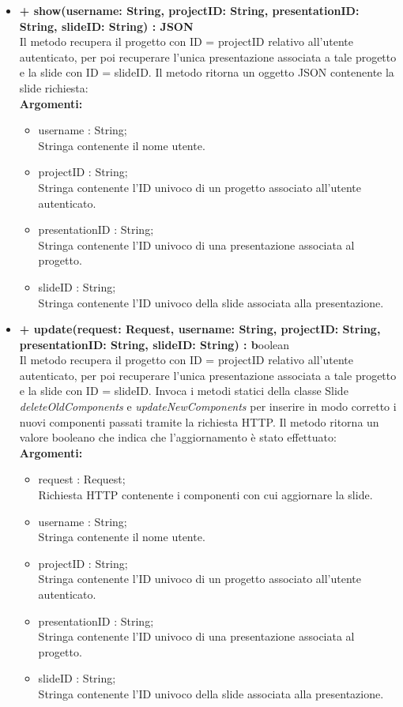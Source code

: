 \begin{itemize}
			\newpage
			\item \textbf{+ show(username: String, projectID: String, presentationID: String, slideID: String) : JSON}\\
				Il metodo recupera il progetto con ID = projectID relativo all'utente autenticato, per poi recuperare l'unica presentazione associata a tale progetto e la slide con ID = slideID. Il metodo ritorna un oggetto JSON contenente la slide richiesta:\\
				\textbf{Argomenti:}
					\begin{itemize}
						\item username : String; \\
						Stringa contenente il nome utente.
						\item projectID : String; \\
						Stringa contenente l'ID univoco di un progetto associato all'utente autenticato.
						\item presentationID : String; \\
						Stringa contenente l'ID univoco di una presentazione associata al progetto.
						\item slideID : String; \\
						Stringa contenente l'ID univoco della slide associata alla presentazione.
					\end{itemize}
					
			\item \textbf{+ update(request: Request, username: String, projectID: String, presentationID: String, slideID: String) : b}oolean\\
				Il metodo recupera il progetto con ID = projectID relativo all'utente autenticato, per poi recuperare l'unica presentazione associata a tale progetto e la slide con ID = slideID. Invoca i metodi statici della classe Slide \textit{deleteOldComponents} e \textit{updateNewComponents} per inserire in modo corretto i nuovi componenti passati tramite la richiesta HTTP. Il metodo ritorna un valore booleano che indica che l'aggiornamento è stato effettuato:\\
					\textbf{Argomenti:}
					\begin{itemize}
						\item request : Request;\\
						Richiesta HTTP contenente i componenti con cui aggiornare la slide.
						\item username : String; \\
						Stringa contenente il nome utente.
						\item projectID : String; \\
						Stringa contenente l'ID univoco di un progetto associato all'utente autenticato.
						\item presentationID : String; \\
						Stringa contenente l'ID univoco di una presentazione associata al progetto.
						\item slideID : String; \\
						Stringa contenente l'ID univoco della slide associata alla presentazione.
					\end{itemize}
					

\end{itemize}
